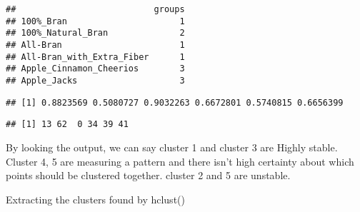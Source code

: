 \documentclass[
]{article}
\newenvironment{Shaded}{\begin{snugshade}}{\end{snugshade}}
\newcommand{\CommentTok}[1]{\textcolor[rgb]{0.56,0.35,0.01}{\textit{#1}}}
\newcommand{\KeywordTok}[1]{\textcolor[rgb]{0.13,0.29,0.53}{\textbf{#1}}}
\newcommand{\NormalTok}[1]{#1}
\newcommand{\OperatorTok}[1]{\textcolor[rgb]{0.81,0.36,0.00}{\textbf{#1}}}
\begin{document}
\begin{Shaded}
\end{Shaded}

\begin{verbatim}
##                           groups
## 100%_Bran                      1
## 100%_Natural_Bran              2
## All-Bran                       1
## All-Bran_with_Extra_Fiber      1
## Apple_Cinnamon_Cheerios        3
## Apple_Jacks                    3
\end{verbatim}

\begin{Shaded}
\end{Shaded}

\begin{verbatim}
## [1] 0.8823569 0.5080727 0.9032263 0.6672801 0.5740815 0.6656399
\end{verbatim}

\begin{Shaded}
\end{Shaded}

\begin{verbatim}
## [1] 13 62  0 34 39 41
\end{verbatim}

By looking the output, we can say cluster 1 and cluster 3 are Highly
stable. Cluster 4, 5 are measuring a pattern and there isn't high
certainty about which points should be clustered together. cluster 2 and
5 are unstable.

Extracting the clusters found by hclust()
\end{document}
